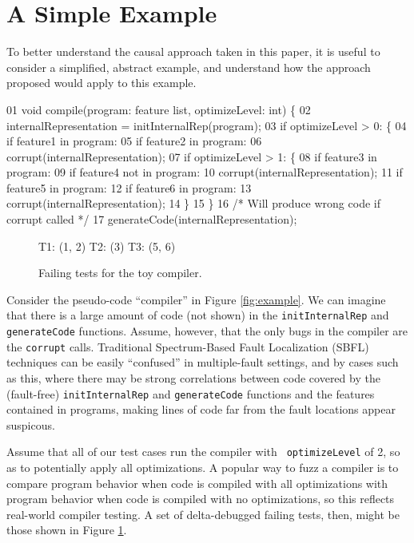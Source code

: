 \section{A Simple Example}
\label{sec:example}

To better understand the causal approach taken in this paper, it is useful to consider a simplified, abstract example, and understand how the approach proposed would apply to this example.

\begin{figure*}
\begin{code}
 01  void compile(program: feature list, optimizeLevel: int) \{
 02    internalRepresentation = initInternalRep(program);
 03    if optimizeLevel > 0: \{
 04       if feature1 in program:
 05          if feature2 in program:
 06             corrupt(internalRepresentation);
 07       if optimizeLevel > 1: \{
 08          if feature3 in program:
 09             if feature4 not in program:
 10                corrupt(internalRepresentation);
 11          if feature5 in program:
 12             if feature6 in program:
 13                corrupt(internalRepresentation);
 14       \}
 15    \}
 16    /* Will produce wrong code if corrupt called */
 17    generateCode(internalRepresentation);
\end{code}
\caption{A toy ``optimizing compiler'' with multiple bugs}
\label{fig:example}
\end{figure*}

\begin{figure}
\begin{code}
T1: (1, 2)
T2: (3)
T3: (5, 6)
\end{code}
\caption{Failing tests for the toy compiler.}
\label{fig:toybugs}
\end{figure}

Consider the pseudo-code ``compiler'' in Figure \ref{fig:example}.  We can imagine that there is a large amount of code (not shown) in the {\tt initInternalRep} and {\tt generateCode} functions.  Assume, however, that the only bugs in the compiler are the {\tt corrupt} calls.  Traditional Spectrum-Based Fault Localization (SBFL) techniques can be easily ``confused'' in multiple-fault settings, and by cases such as this, where there may be strong correlations between code covered by the (fault-free) {\tt initInternalRep} and {\tt generateCode} functions and the features contained in programs, making lines of code far from the fault locations appear suspicous.

Assume that all of our test cases run the compiler with {\tt
  optimizeLevel} of 2, so as to potentially apply all optimizations.
A popular way to fuzz a compiler is to compare program behavior when
code is compiled with all optimizations with program behavior when
code is compiled with no optimizations, so this reflects real-world compiler testing.  A set of delta-debugged failing tests, then, might be those shown in Figure \ref{fig:toybugs}.

